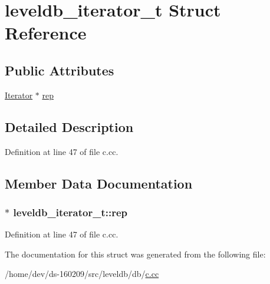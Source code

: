 \hypertarget{structleveldb__iterator__t}{}\section{leveldb\+\_\+iterator\+\_\+t Struct Reference}
\label{structleveldb__iterator__t}
\subsection*{Public Attributes}
\begin{DoxyCompactItemize}
\item 
\hyperlink{classleveldb_1_1_iterator}{Iterator} $\ast$ \hyperlink{structleveldb__iterator__t_a051a1df01c49d34f34628ae1467f9377}{rep}
\end{DoxyCompactItemize}


\subsection{Detailed Description}


Definition at line 47 of file c.\+cc.



\subsection{Member Data Documentation}
\hypertarget{structleveldb__iterator__t_a051a1df01c49d34f34628ae1467f9377}{}
\subsubsection[{rep}]{$\ast$ leveldb\+\_\+iterator\+\_\+t\+::rep}\label{structleveldb__iterator__t_a051a1df01c49d34f34628ae1467f9377}


Definition at line 47 of file c.\+cc.



The documentation for this struct was generated from the following file\+:\begin{DoxyCompactItemize}
\item 
/home/dev/ds-\/160209/src/leveldb/db/\hyperlink{c_8cc}{c.\+cc}\end{DoxyCompactItemize}
